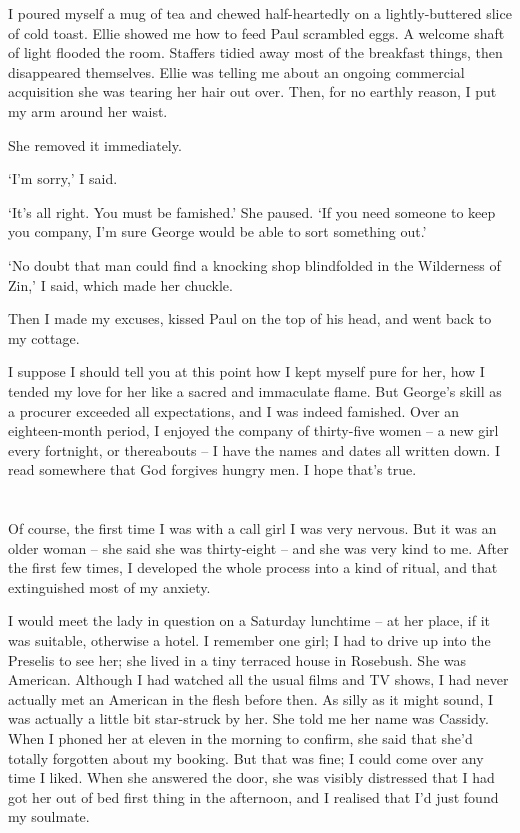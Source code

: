 I poured myself a mug of tea and chewed half-heartedly on a lightly-buttered slice of cold toast. Ellie showed me how to feed Paul scrambled eggs. A welcome shaft of light flooded the room. Staffers tidied away most of the breakfast things, then disappeared themselves. Ellie was telling me about an ongoing commercial acquisition she was tearing her hair out over. Then, for no earthly reason, I put my arm around her waist.

She removed it immediately.

`I'm sorry,' I said.

`It's all right. You must be famished.' She paused. `If you need someone to keep you company, I'm sure George would be able to sort something out.'

`No doubt that man could find a knocking shop blindfolded in the Wilderness of Zin,' I said, which made her chuckle.

Then I made my excuses, kissed Paul on the top of his head, and went back to my cottage.

I suppose I should tell you at this point how I kept myself pure for her, how I tended my love for her like a sacred and immaculate flame. But George's skill as a procurer exceeded all expectations, and I was indeed famished. Over an eighteen-month period, I enjoyed the company of thirty-five women -- a new girl every fortnight, or thereabouts -- I have the names and dates all written down. I read somewhere that God forgives hungry men. I hope that's true.

\section{}

Of course, the first time I was with a call girl I was very nervous. But it was an older woman -- she said she was thirty-eight -- and she was very kind to me. After the first few times, I developed the whole process into a kind of ritual, and that extinguished most of my anxiety.

I would meet the lady in question on a Saturday lunchtime -- at her place, if it was suitable, otherwise a hotel. I remember one girl; I had to drive up into the Preselis to see her; she lived in a tiny terraced house in Rosebush. She was American. Although I had watched all the usual films and TV shows, I had never actually met an American in the flesh before then. As silly as it might sound, I was actually a little bit star-struck by her. She told me her name was Cassidy. When I phoned her at eleven in the morning to confirm, she said that she'd totally forgotten about my booking. But that was fine; I could come over any time I liked. When she answered the door, she was visibly distressed that I had got her out of bed first thing in the afternoon, and I realised that I'd just found my soulmate.

